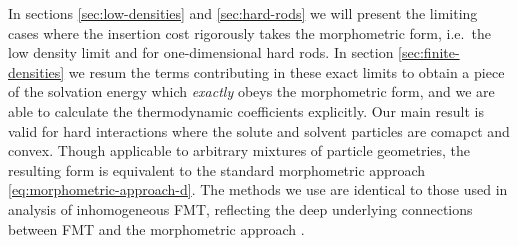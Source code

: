 \documentclass[11pt,twoside]{report}
\begin{document}


In sections \ref{sec:low-densities} and \ref{sec:hard-rods} we will present the limiting cases where the insertion cost rigorously takes the morphometric form, i.e.\ the low density limit and for one-dimensional hard rods.
In section \ref{sec:finite-densities} we resum the terms contributing in these exact limits to obtain a piece of the solvation energy which \emph{exactly} obeys the morphometric form, and we are able to calculate the thermodynamic coefficients explicitly.
Our main result is valid for hard interactions where the solute and solvent particles are comapct and convex.
Though applicable to arbitrary mixtures of particle geometries, the resulting form is equivalent to the standard morphometric approach \eqref{eq:morphometric-approach-d}.
The methods we use are identical to those used in analysis of inhomogeneous FMT, reflecting the deep underlying connections between FMT and the morphometric approach \cite{LeithallPRE2011,KordenPRE2012,MarechalPRE2014}.

\end{document}
